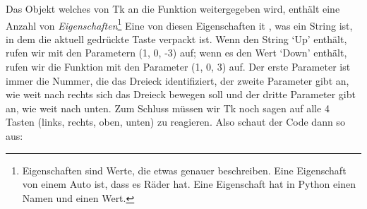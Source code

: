 Das Objekt welches von Tk an die Funktion  weitergegeben wird, enthält eine Anzahl von \emph{Eigenschaften}\footnote{Eigenschaften sind Werte, die etwas genauer beschreiben. Eine Eigenschaft von einem Auto ist, dass es Räder hat. Eine Eigenschaft hat in Python einen Namen und einen Wert.} Eine von diesen Eigenschaften it , was ein String ist, in dem die aktuell gedrückte Taste verpackt ist. Wenn  den String `Up' enthält, rufen wir  mit den Parametern (1, 0, -3) auf; wenn es den Wert `Down' enthält, rufen wir die Funktion mit den Parameter (1, 0, 3) auf. Der erste Parameter ist immer die Nummer, die das Dreieck identifiziert, der zweite Parameter gibt an, wie weit nach rechts sich das Dreieck bewegen soll und der dritte Parameter gibt an, wie weit nach unten. Zum Schluss müssen wir Tk noch sagen auf alle 4 Tasten (links, rechts, oben, unten) zu reagieren. Also schaut der Code dann so aus:

